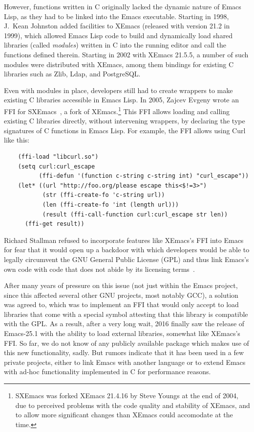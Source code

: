 \documentclass[format=acmsmall, review]{acmart}
\newcommand \Elisp {Emacs Lisp}
\begin{document}
However, functions written in C originally lacked the dynamic nature
of \Elisp{}, as they had to be linked into the Emacs executable.
Starting in 1998, J.\ Kean Johnston added facilities to XEmacs
(released with version 21.2 in 1999), which allowed \Elisp{} code to
build and dynamically load shared libraries (called \textit{modules})
written in C into the running editor and call the functions defined
therein.  Starting in 2002 with XEmacs 21.5.5, a number of such modules
were distributed with XEmacs, among them bindings for existing C
libraries such as Zlib, Ldap, and PostgreSQL.

Even with modules in place, developers still had to create wrappers to
make existing C libraries accessible in \Elisp{}.  In 2005, Zajcev
Evgeny wrote an FFI for SXEmacs~\cite{SXEmacs}, a fork of
XEmacs.\footnote{SXEmacs was forked XEmacs 21.4.16 by Steve Youngs at
  the end of 2004, due to perceived problems with the code quality and
stability of XEmacs, and to allow more significant changes than XEmacs
could accomodate at the time.}
This FFI allows loading and calling existing C libraries directly,
without intervening wrappers, by declaring the type signatures of C
functions in \Elisp{}.  For example, the FFI allows using Curl like
this:
\begin{verbatim}
    (ffi-load "libcurl.so")
    (setq curl:curl_escape
          (ffi-defun '(function c-string c-string int) "curl_escape"))
    (let* ((url "http://foo.org/please escape this<$!=3>")
           (str (ffi-create-fo 'c-string url))
           (len (ffi-create-fo 'int (length url)))
           (result (ffi-call-function curl:curl_escape str len))
      (ffi-get result))
\end{verbatim}

Richard Stallman refused to incorporate features like XEmacs's FFI into Emacs for fear
that it would open up a backdoor with which developers would be able to
legally circumvent the GNU General Public License (GPL) and thus link
Emacs's own code with code that does not abide by its licensing terms~\cite{RMS03}.

After many years of pressure on this issue (not just within the Emacs
project, since this affected several other GNU projects, most notably GCC),
a solution was agreed to, which was to implement an FFI that would only
accept to load libraries that come with a special symbol attesting that this
library is compatible with the GPL.  As a result, after a very long wait,
2016 finally saw the release of Emacs-25.1 with the ability to load external
libraries, somewhat like XEmacs's FFI.  So far, we do not know of any publicly
available package which makes use of this new functionality, sadly.
But rumors indicate that it has been used in a few private projects, either
to link Emacs with another language or to extend Emacs with ad-hoc
functionality implemented in C for performance reasons.
\end{document}

